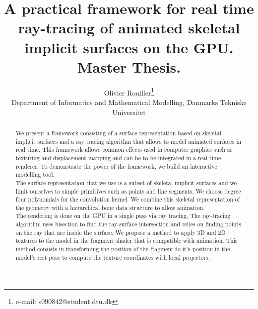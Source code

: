 \documentclass[annual]{acmsiggraph}
\title{A practical framework for real time ray-tracing of animated skeletal implicit surfaces on the GPU.\\Master Thesis.}
\author{Olivier Rouiller\thanks{e-mail: s090842@student.dtu.dk}\\ Department of Informatics and Mathematical Modelling, Danmarks Tekniske Universitet %
}
\begin{document}



\maketitle


\begin{abstract}


We present a framework consisting of a surface representation based on skeletal implicit surfaces and a ray tracing algorithm that allows to model animated surfaces in real time. This framework allows common effects used in computer graphics such as texturing and displacement mapping and can be to be integrated in a real time renderer. To demonstrate the power of the framework, we build an interactive modelling tool.\\
The surface representation that we use is a subset of skeletal implicit surfaces and we limit ourselves to simple primitives such as points and line segments. We choose degree four polynomials for the convolution kernel. We combine this skeletal representation of the geometry with a hierarchical bone data structure to allow animation.\\
The rendering is done on the GPU in a single pass via ray tracing. The ray-tracing algorithm uses bisection to find the ray-surface intersection and relies on finding points on the ray that are inside the surface.
We propose a method to apply 3D and 2D textures to the model in the fragment shader that is compatible with animation. This method consists in transforming the position of the fragment to it's position in the model's rest pose to compute the texture coordinates with local projectors.

\end{abstract}
\end{document}
